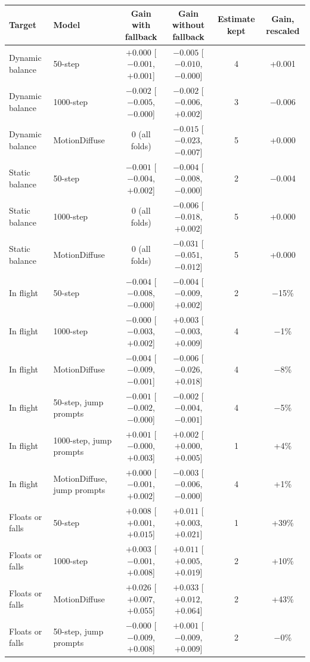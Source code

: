 \begin{tabular}{llcccc}
\toprule
Target & Model & Gain with fallback & Gain without fallback & Estimate kept & Gain, rescaled \\
\midrule
Dynamic balance & 50-step & $+0.000$ [$-0.001$, $+0.001$] & $-0.005$ [$-0.010$, $-0.000$] & 4 & +0.001 \\
Dynamic balance & 1000-step & $-0.002$ [$-0.005$, $-0.000$] & $-0.002$ [$-0.006$, $+0.002$] & 3 & $-$0.006 \\
Dynamic balance & MotionDiffuse & $0$ (all folds) & $-0.015$ [$-0.023$, $-0.007$] & 5 & +0.000 \\
\addlinespace[2pt]
Static balance & 50-step & $-0.001$ [$-0.004$, $+0.002$] & $-0.004$ [$-0.008$, $-0.000$] & 2 & $-$0.004 \\
Static balance & 1000-step & $0$ (all folds) & $-0.006$ [$-0.018$, $+0.002$] & 5 & +0.000 \\
Static balance & MotionDiffuse & $0$ (all folds) & $-0.031$ [$-0.051$, $-0.012$] & 5 & +0.000 \\
\addlinespace[2pt]
In flight & 50-step & $-0.004$ [$-0.008$, $-0.000$] & $-0.004$ [$-0.009$, $+0.002$] & 2 & $-$15\% \\
In flight & 1000-step & $-0.000$ [$-0.003$, $+0.002$] & $+0.003$ [$-0.003$, $+0.009$] & 4 & $-$1\% \\
In flight & MotionDiffuse & $-0.004$ [$-0.009$, $-0.001$] & $-0.006$ [$-0.026$, $+0.018$] & 4 & $-$8\% \\
In flight & 50-step, jump prompts & $-0.001$ [$-0.002$, $-0.000$] & $-0.002$ [$-0.004$, $-0.001$] & 4 & $-$5\% \\
In flight & 1000-step, jump prompts & $+0.001$ [$-0.000$, $+0.003$] & $+0.002$ [$+0.000$, $+0.005$] & 1 & +4\% \\
In flight & MotionDiffuse, jump prompts & $+0.000$ [$-0.001$, $+0.002$] & $-0.003$ [$-0.006$, $-0.000$] & 4 & +1\% \\
\addlinespace[2pt]
Floats or falls & 50-step & $+0.008$ [$+0.001$, $+0.015$] & $+0.011$ [$+0.003$, $+0.021$] & 1 & +39\% \\
Floats or falls & 1000-step & $+0.003$ [$-0.001$, $+0.008$] & $+0.011$ [$+0.005$, $+0.019$] & 2 & +10\% \\
Floats or falls & MotionDiffuse & $+0.026$ [$+0.007$, $+0.055$] & $+0.033$ [$+0.012$, $+0.064$] & 2 & +43\% \\
Floats or falls & 50-step, jump prompts & $-0.000$ [$-0.009$, $+0.008$] & $+0.001$ [$-0.009$, $+0.009$] & 2 & $-$0\% \\

\end{tabular}
